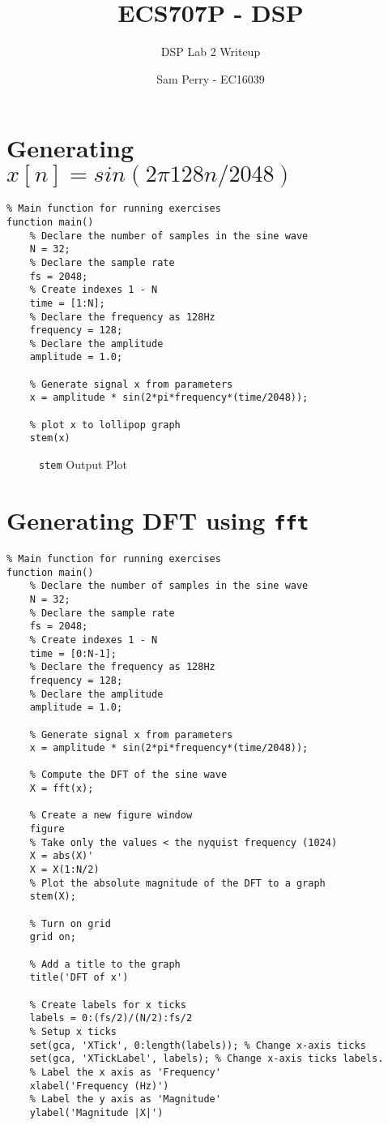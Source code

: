 \documentclass[titlepage]{scrartcl}
\newcommand{\code}[1]{\texttt{#1}}
\begin{document}
\title{ECS707P - DSP}
\subtitle{\LARGE{DSP Lab 2 Writeup}}
\author{Sam Perry - EC16039}

\maketitle

\section{Generating $x[n] = sin(2\pi128n /2048)$}
\begin{lstlisting}
% Main function for running exercises
function main()
    % Declare the number of samples in the sine wave
    N = 32;
    % Declare the sample rate
    fs = 2048;
    % Create indexes 1 - N
    time = [1:N];
    % Declare the frequency as 128Hz
    frequency = 128;
    % Declare the amplitude
    amplitude = 1.0;

    % Generate signal x from parameters
    x = amplitude * sin(2*pi*frequency*(time/2048));

    % plot x to lollipop graph
    stem(x)
\end{lstlisting}

\begin{figure}[H]
    \caption{\code{stem} Output Plot}
\end{figure}

\section{Generating DFT using \code{fft}}

\begin{lstlisting}
% Main function for running exercises
function main()
    % Declare the number of samples in the sine wave
    N = 32;
    % Declare the sample rate
    fs = 2048;
    % Create indexes 1 - N
    time = [0:N-1];
    % Declare the frequency as 128Hz
    frequency = 128;
    % Declare the amplitude
    amplitude = 1.0;

    % Generate signal x from parameters
    x = amplitude * sin(2*pi*frequency*(time/2048));

    % Compute the DFT of the sine wave
    X = fft(x);

    % Create a new figure window
    figure
    % Take only the values < the nyquist frequency (1024)
    X = abs(X)'
    X = X(1:N/2)
    % Plot the absolute magnitude of the DFT to a graph
    stem(X);

    % Turn on grid
    grid on;
    
    % Add a title to the graph
    title('DFT of x')
    
    % Create labels for x ticks
    labels = 0:(fs/2)/(N/2):fs/2
    % Setup x ticks
    set(gca, 'XTick', 0:length(labels)); % Change x-axis ticks
    set(gca, 'XTickLabel', labels); % Change x-axis ticks labels.
    % Label the x axis as 'Frequency'
    xlabel('Frequency (Hz)')
    % Label the y axis as 'Magnitude'
    ylabel('Magnitude |X|')
\end{lstlisting}
\end{document}

